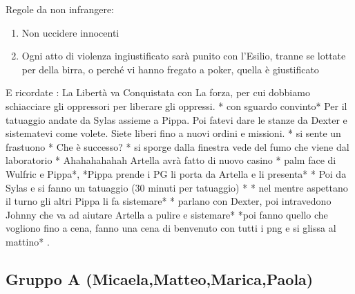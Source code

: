 \documentclass{article}
\begin{document}
Regole da non infrangere: 
\begin{enumerate}
    \item Non uccidere innocenti
    \item Ogni atto di violenza ingiustificato sarà punito con l’Esilio, tranne se lottate per della birra, o perché vi hanno fregato a poker, quella è giustificato
\end{enumerate}

E ricordate : La Libertà va Conquistata con La forza, per cui dobbiamo schiacciare gli oppressori per liberare gli oppressi. * con sguardo convinto* 
 Per il tatuaggio andate da Sylas assieme a Pippa. 
Poi fatevi dare le stanze da Dexter e sistematevi come volete. Siete liberi fino a nuovi ordini e missioni. * si sente un frastuono * Che è successo? * si sporge dalla finestra vede del fumo che viene dal laboratorio * Ahahahahahah Artella avrà fatto di nuovo casino * palm face di Wulfric e Pippa*, *Pippa prende i PG li porta da Artella e li presenta* * Poi da Sylas e si fanno un tatuaggio (30 minuti per tatuaggio) * * nel mentre aspettano il turno gli altri Pippa li fa sistemare* * parlano con Dexter, poi intravedono Johnny che va ad aiutare Artella a pulire e sistemare* *poi fanno quello che vogliono fino a cena, fanno una cena di benvenuto con tutti i png e si glissa al mattino* .

\subsection{Gruppo A (Micaela,Matteo,Marica,Paola)}
\end{document}
